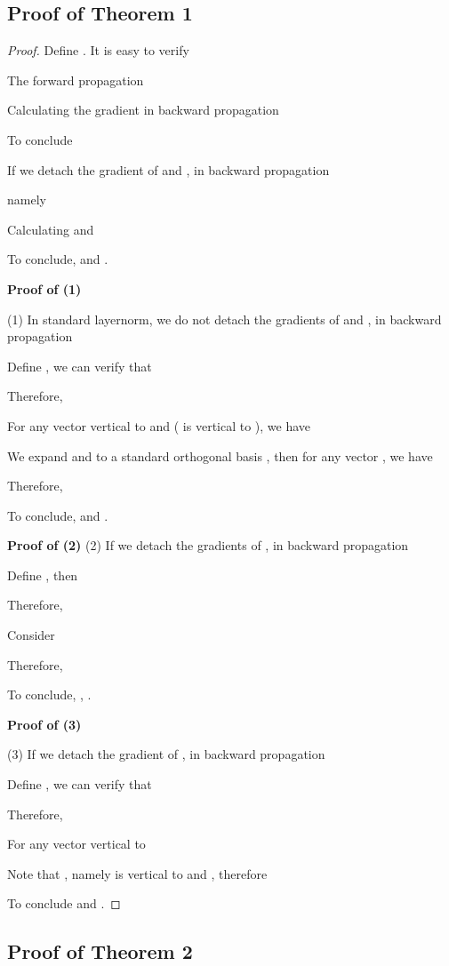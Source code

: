 \documentclass{article}
\begin{document}
\subsection{Proof of Theorem 1}
\begin{proof}
Define . It is easy to verify


The forward propagation 


Calculating the gradient in backward propagation


To conclude


If we detach the gradient of  and , in backward propagation

namely


Calculating  and 


To conclude,  and .


\textbf{Proof of (1)}

(1) In standard layernorm, we do not detach the gradients of  and , in backward propagation


Define , we can verify that


Therefore, 


For any vector  vertical to  and  (  is vertical to ), we have


We expand  and  to a standard orthogonal basis , then for any vector , we have


Therefore, 


To conclude,  and .

\textbf{Proof of (2)}
(2) If we detach the gradients of , in backward propagation


Define , then


Therefore, 


Consider


Therefore, 


To conclude, , .

\textbf{Proof of (3)}

(3) If we detach the gradient of , in backward propagation


Define , we can verify that


Therefore, 


For any vector  vertical to 


Note that , namely  is vertical to  and , therefore



To conclude  and .

\end{proof}

\clearpage
\subsection{Proof of Theorem 2}
\end{document}
